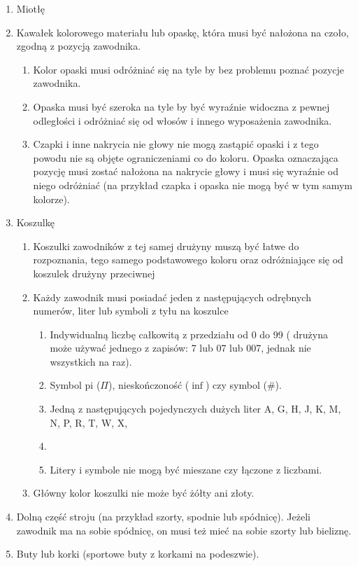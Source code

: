 \documentclass[12pt]{article}
\begin{document}
\begin{enumerate}
	\item
	      Miotłę
	\item
	      Kawałek kolorowego materiału lub opaskę, która musi być nałożona na
	      czoło, zgodną z pozycją zawodnika.

	      \begin{enumerate}
		      \item
		            Kolor opaski musi odróżniać się na tyle by bez problemu poznać
		            pozycje zawodnika.
		      \item
		            Opaska musi być szeroka na tyle by być wyraźnie widoczna z pewnej
		            odległości i odróżniać się od włosów i innego wyposażenia zawodnika.
		      \item
		            Czapki i inne nakrycia nie głowy nie mogą zastąpić opaski i z tego
		            powodu nie są objęte ograniczeniami co do koloru. Opaska oznaczająca
		            pozycję musi zostać nałożona na nakrycie głowy i musi się wyraźnie
		            od niego odróżniać (na przykład czapka i opaska nie mogą być w tym
		            samym kolorze).
	      \end{enumerate}
	\item
	      Koszulkę

	      \begin{enumerate}
		      \item
		            Koszulki zawodników z tej samej drużyny muszą być łatwe do
		            rozpoznania, tego samego podstawowego koloru oraz odróżniające się
		            od koszulek drużyny przeciwnej
		      \item
		            Każdy zawodnik musi posiadać jeden z następujących odrębnych
		            numerów, liter lub symboli z tyłu na koszulce

		            \begin{enumerate}
			            \item
			                  Indywidualną liczbę całkowitą z przedziału od 0 do 99 ( drużyna
			                  może używać jednego z zapisów: 7 lub 07 lub 007, jednak nie
			                  wszystkich na raz).
			            \item
			                  Symbol pi ($\Pi$), nieskończoność ($\inf$) czy symbol (\#).
			            \item
			                  Jedną z następujących pojedynczych dużych liter A, G, H, J, K, M,
			                  N, P, R, T, W, X, \item
			            \item
			                  Litery i symbole nie mogą być mieszane czy łączone z liczbami.
		            \end{enumerate}
		      \item
		            Główny kolor koszulki nie może być żółty ani złoty.
	      \end{enumerate}
	\item
	      Dolną część stroju (na przykład szorty, spodnie lub spódnicę). Jeżeli
	      zawodnik ma na sobie spódnicę, on musi też mieć na sobie szorty lub
	      bieliznę.
	\item
	      Buty lub korki (sportowe buty z korkami na podeszwie).


\end{enumerate}
\end{document}
